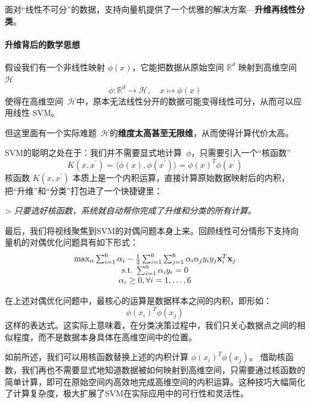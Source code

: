 {面对“线性不可分”的数据，支持向量机提供了一个优雅的解决方案---\textbf{升维再线性分类}。

%

\paragraph{升维背后的数学思想}
假设我们有一个非线性映射 $\phi(x)$，它能把数据从原始空间 $\mathbb{R}^d$ 映射到高维空间 $\mathcal{H}$
\[
\phi: \mathbb{R}^d \rightarrow \mathcal{H}, \quad x \mapsto \phi(x)
\]
使得在高维空间~$\mathcal{H}$中，原本无法线性分开的数据可能变得线性可分，从而可以应用线性 SVM。

但这里面有一个实际难题~$\mathcal{H}$的\textbf{维度太高甚至无限维}，从而使得计算代价太高。

SVM的聪明之处在于：我们并不需要显式地计算~$\phi$，只需要引入一个“核函数”
\begin{equation}\label{kernel_func}
K({ x}, {x}^\prime) = \langle \phi({x}), \phi({x}^\prime) \rangle=\phi({ x})^T\phi({ x}^\prime) 
\end{equation}
核函数 $K(x, x^\prime)$ 本质上是一个内积运算，直接计算原始数据映射后的内积，把“升维”和“分类”打包进了一个快捷键里：

> \textit{只要选好核函数，系统就自动帮你完成了升维和分类的所有计算。}


最后，我们将视线聚焦到SVM的对偶问题本身上来。回顾线性可分情形下支持向量机的对偶优化问题具有如下形式：
\begin{equation*}
\begin{array}{c}
{\rm max}_{\alpha} \sum_{i=1}^6 \alpha_i -\frac{1}{2} \sum_{i=1}^6 \sum_{j=1}^6 \alpha_i \alpha_j y_i y_j {\bf x}_i^T {\bf x}_j \\
{\rm s.t.} \;  \sum_{i=1}^6 \alpha_i y_i =0 \\
\alpha_i \ge 0, \forall i=1, \dots, 6 
   \end{array}
\end{equation*}

在上述对偶优化问题中，最核心的运算是数据样本之间的内积，即形如：
\[
\phi(x_i)^T \phi(x_j)
\]
这样的表达式。这实际上意味着，在分类决策过程中，我们只关心数据点之间的相似程度，而不是数据本身具体在高维空间中的位置。

如前所述，我们可以用核函数替换上述的内积计算 $\phi(x_i)^T \phi(x_j)$。
借助核函数，我们再也不需要显式地知道数据被如何映射到高维空间，只需要通过核函数的简单计算，即可在原始空间内高效地完成高维空间的内积运算。这种技巧大幅简化了计算复杂度，极大扩展了SVM在实际应用中的可行性和灵活性。

}
